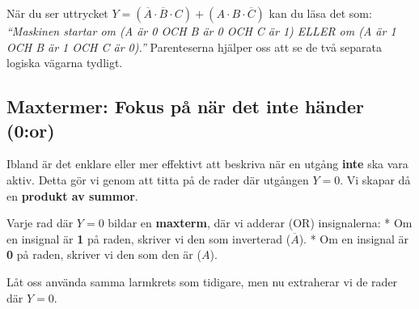 \documentclass[
  swedish,
  letterpaper,
  oneside,
  openany]{book}
\begin{document}
\begin{tcolorbox}[enhanced jigsaw, arc=.35mm, bottomrule=.15mm, bottomtitle=1mm, breakable, colback=white, colbacktitle=quarto-callout-tip-color!10!white, colframe=quarto-callout-tip-color-frame, coltitle=black, left=2mm, leftrule=.75mm, opacityback=0, opacitybacktitle=0.6, rightrule=.15mm, title=\textcolor{quarto-callout-tip-color}{\faLightbulb}\hspace{0.5em}{Så här läser du uttrycket}, titlerule=0mm, toprule=.15mm, toptitle=1mm]

När du ser uttrycket
\(Y = (\overline{A} \cdot \overline{B} \cdot C) + (A \cdot B \cdot \overline{C})\)
kan du läsa det som: \emph{``Maskinen startar om (A är 0 OCH B är 0 OCH
C är 1) ELLER om (A är 1 OCH B är 1 OCH C är 0).''} Parenteserna hjälper
oss att se de två separata logiska vägarna tydligt.

\end{tcolorbox}

\subsection{Maxtermer: Fokus på när det inte händer
(0:or)}\label{maxtermer-fokus-puxe5-nuxe4r-det-inte-huxe4nder-0or}

Ibland är det enklare eller mer effektivt att beskriva när en utgång
\textbf{inte} ska vara aktiv. Detta gör vi genom att titta på de rader
där utgången \(Y = 0\). Vi skapar då en \textbf{produkt av summor}.

Varje rad där \(Y = 0\) bildar en \textbf{maxterm}, där vi adderar (OR)
insignalerna: * Om en insignal är \textbf{1} på raden, skriver vi den
som inverterad (\(\overline{A}\)). * Om en insignal är \textbf{0} på
raden, skriver vi den som den är (\(A\)).

Låt oss använda samma larmkrets som tidigare, men nu extraherar vi de
rader där \(Y = 0\).
\end{document}
